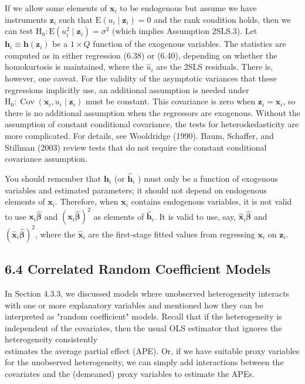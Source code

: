 \documentclass[10pt]{article}
\begin{document}
If we allow some elements of $\mathbf{x}_{i}$ to be endogenous but assume we have instruments $\mathbf{z}_{i}$ such that $\mathrm{E}\left(u_{i} \mid \mathbf{z}_{i}\right)=0$ and the rank condition holds, then we can test $\mathrm{H}_{0}: \mathrm{E}\left(u_{i}^{2} \mid \mathbf{z}_{i}\right) =\sigma^{2}$ (which implies Assumption 2SLS.3). Let $\mathbf{h}_{i} \equiv \mathbf{h}\left(\mathbf{z}_{i}\right)$ be a $1 \times Q$ function of the exogenous variables. The statistics are computed as in either regression (6.38) or (6.40), depending on whether the homokurtosis is maintained, where the $\hat{u}_{i}$ are the 2SLS residuals. There is, however, one caveat. For the validity of the asymptotic variances that these regressions implicitly use, an additional assumption is needed under $\mathrm{H}_{0}: \operatorname{Cov}\left(\mathbf{x}_{i}, u_{i} \mid \mathbf{z}_{i}\right)$ must be constant. This covariance is zero when $\mathbf{z}_{i}=\mathbf{x}_{i}$, so there is no additional assumption when the regressors are exogenous. Without the assumption of constant conditional covariance, the tests for heteroskedasticity are more complicated. For details, see Wooldridge (1990). Baum, Schaffer, and Stillman (2003) review tests that do not require the constant conditional covariance assumption.

You should remember that $\mathbf{h}_{i}$ (or $\hat{\mathbf{h}}_{i}$ ) must only be a function of exogenous variables and estimated parameters; it should not depend on endogenous elements of $\mathbf{x}_{i}$. Therefore, when $\mathbf{x}_{i}$ contains endogenous variables, it is not valid to use $\mathbf{x}_{i} \hat{\boldsymbol{\beta}}$ and $\left(\mathbf{x}_{i} \hat{\boldsymbol{\beta}}\right)^{2}$ as elements of $\hat{\mathbf{h}}_{i}$. It is valid to use, say, $\hat{\mathbf{x}}_{i} \hat{\boldsymbol{\beta}}$ and $\left(\hat{\mathbf{x}}_{i} \hat{\boldsymbol{\beta}}\right)^{2}$, where the $\hat{\mathbf{x}}_{i}$ are the first-stage fitted values from regressing $\mathbf{x}_{i}$ on $\mathbf{z}_{i}$.

\subsection*{6.4 Correlated Random Coefficient Models}
In Section 4.3.3, we discussed models where unobserved heterogeneity interacts with one or more explanatory variables and mentioned how they can be interpreted as "random coefficient" models. Recall that if the heterogeneity is independent of the covariates, then the usual OLS estimator that ignores the heterogeneity consistently\\
estimates the average partial effect (APE). Or, if we have suitable proxy variables for the unobserved heterogeneity, we can simply add interactions between the covariates and the (demeaned) proxy variables to estimate the APEs.
\end{document}
